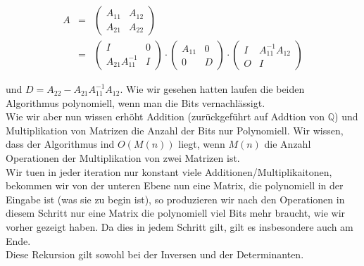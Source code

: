 \documentclass[11pt,a4paper,ngerman]{article}
\begin{document}
\begin{description}
        \begin{equation*}\begin{array}{rcl}
            A &=& \left( \begin{array}{cc} A_{11} & A_{12} \\ A_{21} & A_{22} \end{array}\right)\\
                &=& \left( \begin{array}{cc}I & 0 \\ A_{21}A_{11}^{-1} & I \end{array}\right) \cdot 
                \left( \begin{array}{cc} A_{11} & 0 \\ 0 & D \end{array} \right) \cdot 
                \left( \begin{array}{cc} I & A_{11}^{-1}A_{12} \\ O & I \end{array}\right)
        \end{array}\end{equation*}


        und $D = A_{22} - A_{21}A_{11}^{-1}A_{12}$. Wie wir gesehen hatten 
        laufen die beiden Algorithmus polynomiell, wenn man die Bits vernachlässigt.\\
        Wie wir aber nun wissen erhöht Addition (zurückgeführt auf Addtion von $\mathbb{Q}$) und Multiplikation
        von Matrizen die Anzahl der Bits nur Polynomiell.
        Wir wissen, dass der Algorithmus ind $O(M(n))$ liegt, wenn $M(n)$ die Anzahl Operationen der Multiplikation von
        zwei Matrizen ist.\\
    
        Wir tuen in jeder iteration nur konstant viele Additionen/Multiplikaitonen, bekommen wir von der unteren Ebene
        nun eine Matrix, die polynomiell in der Eingabe ist (was sie zu begin ist), so produzieren wir
        nach den Operationen in diesem Schritt nur eine Matrix die polynomiell viel Bits mehr braucht, wie wir vorher gezeigt haben.
        Da dies in jedem Schritt gilt, gilt es insbesondere auch am Ende.\\

        Diese Rekursion gilt sowohl bei der Inversen und der Determinanten.
\end{description}



\label{LastPage}
\end{document}
